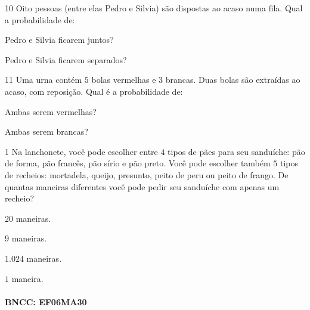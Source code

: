 {\num{10} Oito pessoas (entre elas Pedro e Silvia) são dispostas ao acaso numa
fila. Qual a probabilidade de:

\begin{escolha}
\item Pedro e Silvia ficarem juntos? 
\item Pedro e Silvia ficarem separados? 
\end{escolha}

\num{11} Uma urna contém $5$ bolas vermelhas e $3$ brancas. Duas bolas são
extraídas ao acaso, com reposição. Qual é a probabilidade de:

\begin{escolha}
\item Ambas serem vermelhas? 
\item Ambas serem brancas? 
\end{escolha}


\num{1}  Na lanchonete, você pode escolher entre $4$ tipos de pães para seu
sanduíche: pão de forma, pão francês, pão sírio e pão preto. Você pode
escolher também $5$ tipos de recheios: mortadela, queijo, presunto, peito
de peru ou peito de frango. De quantas maneiras diferentes você pode
pedir seu sanduíche com apenas um recheio?

\begin{escolha}
\item $20$ maneiras.
\item $9$ maneiras.
\item $1.024$ maneiras.
\item $1$ maneira.
\end{escolha}

\paragraph{BNCC: EF06MA30 }


}
